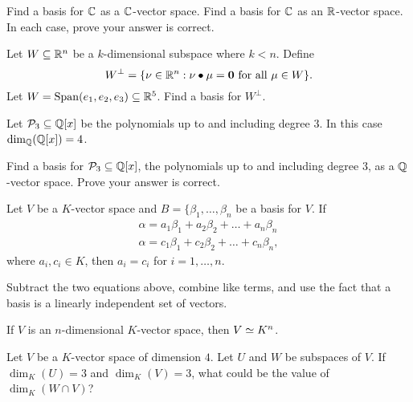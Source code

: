 \documentclass{ximera}
\begin{document}
\begin{exercise}
  Find a basis for $\mathbb C$ as a $\mathbb C$-vector space. Find a basis for $\mathbb C$
  as an $\mathbb R$-vector space. In each case, prove your answer is correct.
\end{exercise}


\begin{exercise}
   Let $W\subseteq \mathbb R^n$ be a $k$-dimensional subspace where $k<n$.
   Define
   \[
   W^\perp = \{\nu\in\mathbb R^n: \nu\bullet\mu = \mathbf{0}\text{ for all $\mu\in W$} \}.
   \]
   Let $W = \operatorname{Span}(e_1,e_2,e_3)\subseteq \mathbb R^5$. Find a basis
   for $W^\perp$.
\end{exercise}




\begin{example}
  Let $\mathcal{P}_3\subseteq \mathbb Q[x]$ be the polynomials up to and including degree
  $3$. In this case $\dim_{\mathbb Q}(\mathbb Q[x]) = 4$.
\end{example}

\begin{exercise}
  Find a basis for $\mathcal{P}_3\subseteq \mathbb Q[x]$, the polynomials up to and
  including degree $3$, as a $\mathbb Q$-vector space. Prove your answer is
  correct.
\end{exercise}


\begin{theorem}
  Let $V$ be a $K$-vector space and $B = \{\beta_1,\dots,\beta_n$ be a
  basis for $V$. If
  \begin{align*}
  \alpha = a_1\beta_1 + a_2\beta_2 + \dots + a_n\beta_n\\
  \alpha = c_1\beta_1 + c_2\beta_2 + \dots + c_n\beta_n,
  \end{align*}
  where $a_i, c_i\in K$, then $a_i = c_i$ for $i =1,\dots, n$.
  \begin{sketch}
    Subtract the two equations above, combine like terms, and use the
    fact that a basis is a linearly independent set of vectors.
  \end{sketch}
\end{theorem}


\begin{corollary}
  If $V$ is an $n$-dimensional $K$-vector space, then $V\simeq K^n$.
\end{corollary}

\begin{exercise}
  Let $V$ be a $K$-vector space of dimension $4$. Let $U$ and $W$ be
  subspaces of $V$. If $\dim_K(U) = 3$ and $\dim_K(V) =3$, what could
  be the value of $\dim_K(W\cap V)$?
\end{exercise}
\end{document}
